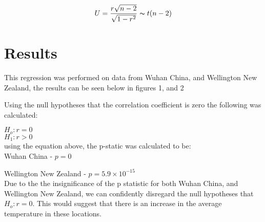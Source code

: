 \documentclass[a4paper,11pt]{article}
\begin{document}
\begin{preview}
$$U = \frac{r\sqrt{n-2}}{\sqrt{1-r^2}} \thicksim t(n-2)$$

\section*{Results}

This regression was performed on data from Wuhan China, and Wellington New Zealand, the results can be seen below in figures 1, and 2

\begin{center}
\end{center}

\begin{center}
\end{center}
 
Using the null hypotheses that the correlation coefficient is zero the following was calculated:

$H_o : r = 0$\\
$H_1 : r > 0$\\

using the equation above, the p-static was calculated to be:\\

Wuhan China - $p = 0$

Wellington New Zealand - $p = 5.9\times 10^{-15} $\\

Due to the the insignificance of the p statistic for both Wuhan China, and Wellington New Zealand, we can confidently disregard the null hypotheses that $H_o : r = 0$. This would suggest that there is an increase in the average temperature in these locations.


\end{preview}
\end{document}
